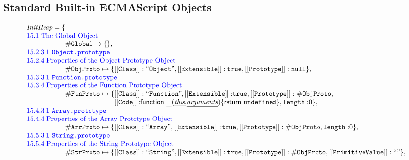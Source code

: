 \subsection*{ Standard Built-in ECMAScript Objects}
\[
\begin{array}{rl}

\multicolumn{2}{l}{\emph{InitHeap} = \{}\\
\multicolumn{2}{l}{\mbox{\inblue 15.1 The Global Object}}\\
\multicolumn{2}{l}{\phantom{\emph{InitHeap} = \{}
\lg\mapsto \{\},}\\
\multicolumn{2}{l}{\mbox{\inblue 15.2.3.1 {\tt Object.prototype}}}\\
\multicolumn{2}{l}{\mbox{\inblue 15.2.4 Properties of the Object Prototype Object}}\\
\multicolumn{2}{l}{\phantom{\emph{InitHeap} = \{}
{\tt\#ObjProto} \mapsto
\{{\tt [[Class]]: ``Object"}, {\tt [[Extensible]]: \true}, {\tt [[Prototype]]: \nullK}\},}\\

\multicolumn{2}{l}{\mbox{\inblue 15.3.3.1 {\tt Function.prototype}}}\\
\multicolumn{2}{l}{\mbox{\inblue 15.3.4 Properties of the Function Prototype Object}}\\
\multicolumn{2}{l}{\phantom{\emph{InitHeap} = \{}
{\tt\#FtnProto} \mapsto \{{\tt [[Class]]: ``Function"}, {\tt [[Extensible]]:} \true,%
{\tt [[Prototype]]: \#ObjProto},}\\
\multicolumn{2}{l}{\phantom{\emph{InitHeap} = \{{\tt\#FtnProto} \mapsto \{}
{\tt [[Code]]:} {\sf function} \ \ir{\_} {\tt(}\ir{\emph{this}}{\tt,}\ir{\emph{arguments}}{\tt) \{}
{\sf return} \ \undef {\tt\}}, {\tt length:} 0\},}\\

\multicolumn{2}{l}{\mbox{\inblue 15.4.3.1 {\tt Array.prototype}}}\\
\multicolumn{2}{l}{\mbox{\inblue 15.4.4 Properties of the Array Prototype Object}}\\
\multicolumn{2}{l}{\phantom{\emph{InitHeap} = \{}
{\tt\#ArrProto} \mapsto \{{\tt [[Class]]: ``Array"}, {\tt [[Extensible]]:} \true,%
{\tt [[Prototype]]: \#ObjProto},
{\tt length:} 0\},}\\

\multicolumn{2}{l}{\mbox{\inblue 15.5.3.1 {\tt String.prototype}}}\\
\multicolumn{2}{l}{\mbox{\inblue 15.5.4 Properties of the String Prototype Object}}\\
\multicolumn{2}{l}{\phantom{\emph{InitHeap} = \{}
{\tt\#StrProto} \mapsto \{{\tt [[Class]]: ``String"}, {\tt [[Extensible]]: \true}, {\tt [[Prototype]]: \#ObjProto}, {\tt [[PrimitiveValue]]: ``"} \},}\\


\end{array}\]
